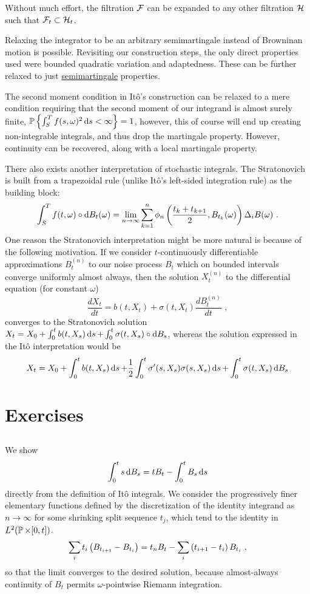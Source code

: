 \documentclass{article}
\begin{document}
Without much effort, the filtration \(\mcF\) can be expanded to any other filtration \(\mcH\) such that \(\mcF_t\subset\mcH_t\).

Relaxing the integrator to be an arbitrary semimartingale instead of Browninan motion is possible. Revisiting our construction steps, the only direct properties used were bounded quadratic variation and adaptedness. These can be further relaxed to just \href{https://en.wikipedia.org/wiki/Semimartingale}{semimartingale} properties.

The second moment condition in It\^{o}'s construction can be relaxed to a mere condition requiring that the second moment of our integrand is almost surely finite, \(\P\ca{\int_S^Tf(s,\omega)^2\d{s}<\infty}=1\), however, this of course will end up creating non-integrable integrals, and thus drop the martingale property. However, continuity can be recovered, along with a local martingale property.

There also exists another interpretation of stochastic integrals. The Stratonovich is built from a trapezoidal rule (unlike It\^{o}'s left-sided integration rule) as the building block:
  \[
\int_S^Tf(t, \omega)\circ \d{B_t(\omega)}=\lim_{n\rightarrow\infty}\sum_{k=1}^n\phi_n\pa{\frac{t_k+t_{k+1}}{2}, B_{t_k}(\omega)}\Delta_i B(\omega)\,\,.
\]
One reason the Stratonovich interpretation might be more natural is because of the following motivation. If we consider \(t\)-continuously differentiable approximations \(B_t^{(n)}\) to our noise process \(B_t\) which on bounded intervals converge uniformly almost always, then the solution \(X^{(n)}_t\) to the differential equation (for constant \(\omega\))
\[
\frac{d X_t}{dt}=b(t,X_t)+\sigma(t,X_t)\frac{dB_t^{(n)}}{dt}\,\,,
\]
converges to the Stratonovich solution \(X_t=X_0+\int_0^tb(t, X_s)\d{s}+\int_0^t\sigma(t, X_s)\circ\d{B_s}\), whereas the solution expressed in the It\^{o} interpretation would be
\[
  X_t=X_0+\int_0^tb(t, X_s)\d{s}+\frac{1}{2}\int_0^{t}\sigma'(s, X_s)\sigma(s, X_s)\d{s}+\int_0^t\sigma(t, X_s)\d{B_s}
  \]

\section{Exercises}

\subsection{}
\label{pt1}
We show
\[
  \int_0^t s\d{B_s}=tB_t-\int_0^tB_s\d{s}
\]
directly from the definition of It\^{o} integrals. We consider the progressively finer elementary functions defined by the discretization of the identity integrand as \(n\rightarrow\infty\) for some shrinking split sequence \(t_j\), which tend to the identity in \(L^2(\P\times[0,t])\).
\[
  \sum_it_i\pa{B_{t_{i+1}}-B_{t_{i}}}=  t_nB_t-\sum_i\pa{t_{i+1}-t_{i}}B_{t_i}\,\,,
\]
so that the limit converges to the desired solution, because almost-always continuity of \(B_t\) permits \(\omega\)-pointwise Riemann integration.
\end{document}
